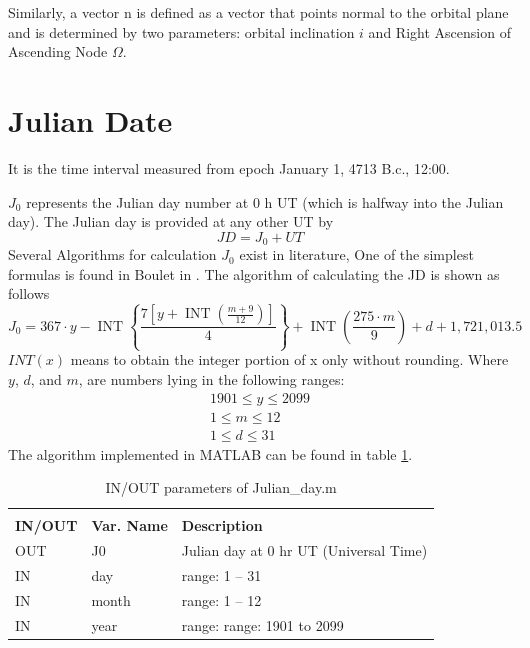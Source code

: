 Similarly, a vector n is defined as a vector that points normal to the orbital plane and is determined by two parameters: orbital inclination $i$ and Right Ascension of Ascending Node $\Omega$. 



\section{Julian Date}
It is the time interval measured from epoch January 1, 4713 B.c., 12:00.

$J_0$ represents the Julian day number at 0 h UT (which is halfway into the Julian day). The Julian day is provided at any other UT by
\begin{equation}
    JD = J_{0}+UT
\end{equation}
Several Algorithms for calculation $J_0$ exist in literature, One of the simplest formulas is found in Boulet in \cite{boulet1991methods}.
The algorithm of calculating the JD is shown as follows
\begin{equation}
J_{0}=367 \cdot y-\operatorname{INT}\left\{\frac{7\left[y+\operatorname{INT}\left(\frac{m+9}{12}\right)\right]}{4}\right\}+\operatorname{INT}\left(\frac{275 \cdot m}{9}\right)+d+1,721,013.5    
\end{equation}
$INT(x)$ means to obtain the integer portion of x only without rounding.
Where $y$, $d$, and $m$, are numbers lying in the following ranges:
$$
\begin{gathered}
1901 \leq y \leq 2099 \\
1 \leq m \leq 12 \\
1 \leq d \leq 31
\end{gathered}
$$
The algorithm implemented in MATLAB can be found in table \ref{tab:j0}.

\begin{table}[H]
\centering
\caption{IN/OUT parameters of Julian\_day.m}
\label{tab:j0}
\begin{tabular}{lll}
\rowcolor[HTML]{000000} 
\multicolumn{3}{l}{\cellcolor[HTML]{000000}{\color[HTML]{FFFFFF} Julian\_day.m: Calculating the julian day}}                                                \\
\rowcolor[HTML]{000000} 
{\color[HTML]{FFFFFF} \textbf{IN/OUT}} & {\color[HTML]{FFFFFF} \textbf{Var. Name}} & {\color[HTML]{FFFFFF} \textbf{Description}} \\
OUT & J0 & Julian day at 0 hr UT (Universal Time)\\
IN & day & range: 1 -- 31 \\
IN & month & range: 1 -- 12\\
IN & year & range: range: 1901 to 2099
\end{tabular}%
\end{table}

